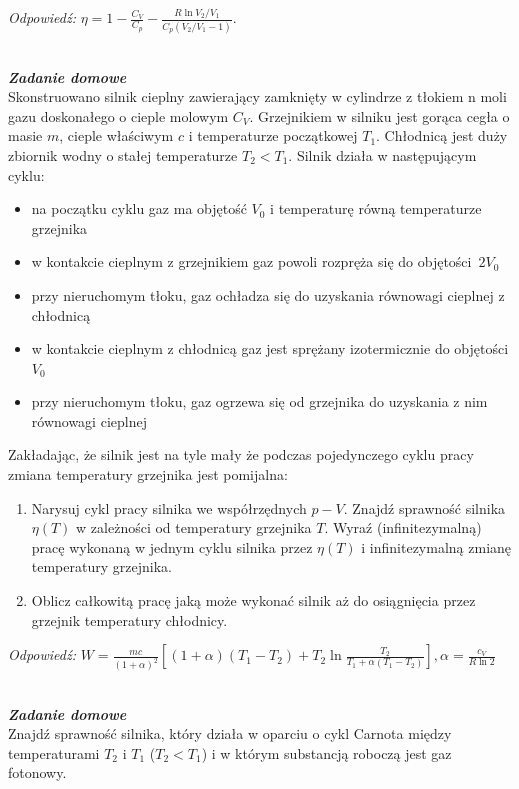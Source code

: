 \documentclass[11pt,a4paper]{article}
\newcounter{zaddom}\newcommand{\zaddom}[1][]{\addtocounter{zaddom}{1} ~\\  {\bf \emph{Zadanie domowe \arabic{zaddom} #1 }} \\}
\begin{document}
{\it Odpowiedź:} $\eta = 1 - \frac{C_V}{C_p} - \frac{R \ln V_2/V_1}{C_p(V_2/V_1 - 1)}$.

\zaddom

Skonstruowano silnik cieplny zawierający zamknięty w cylindrze 
z tłokiem n moli gazu doskonałego o cieple molowym  $C_V$.
Grzejnikiem w silniku jest gorąca cegła o masie $m$, cieple właściwym $c$ i temperaturze początkowej $T_1$. 
Chłodnicą jest duży zbiornik wodny o stałej temperaturze $T_2<T_1$. Silnik działa w następującym cyklu:
\begin{itemize}
\item[--] na początku cyklu gaz ma objętość $V_0$ i temperaturę równą temperaturze grzejnika
\item[--] w kontakcie cieplnym z grzejnikiem gaz powoli rozpręża się do objętości~$2V_0$
\item[--] przy nieruchomym tłoku, gaz ochładza się do uzyskania równowagi cieplnej z chłodnicą
\item[--] w kontakcie cieplnym z chłodnicą gaz jest sprężany izotermicznie do objętości $V_0$
\item[--] przy nieruchomym tłoku, gaz ogrzewa się od grzejnika do uzyskania z nim równowagi cieplnej
\end{itemize}

\noindent
Zakładając, że silnik jest na tyle mały że podczas pojedynczego cyklu pracy zmiana temperatury grzejnika jest pomijalna:
\begin{enumerate}
\item Narysuj cykl pracy silnika we współrzędnych $p-V$. Znajdź sprawność silnika $\eta(T)$ w zależności od temperatury grzejnika $T$. 
Wyraź (infinitezymalną) pracę wykonaną w jednym cyklu silnika przez $\eta(T)$ i infinitezymalną zmianę temperatury grzejnika.
\item Oblicz całkowitą pracę jaką może wykonać silnik aż do osiągnięcia 
przez grzejnik temperatury chłodnicy. \\[1mm]
\end{enumerate}

{\it Odpowiedź:} 
$W = \frac{mc}{(1+\alpha)^{2}} 
\left[  
    (1+\alpha)(T_{1} - T_{2}) + T_{2} \ln \frac{T_{2}}{T_{1} + \alpha (T_{1} - T_{2})}
\right], \alpha = \frac{c_{V}}{R\ln2}
$

\zaddom
Znajdź sprawność silnika, który działa w oparciu o cykl Carnota między temperaturami 
$T_2$ i $T_1$ ($T_2<T_1$) i w którym substancją roboczą jest gaz fotonowy.\\[1mm]
\end{document}
